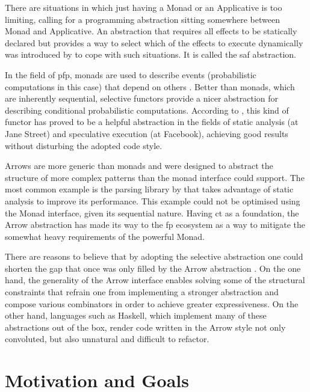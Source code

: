 \documentclass[
  oneside,
  11pt, a4paper,
  footinclude=true,
  headinclude=true,
  cleardoublepage=empty
]{scrbook}
\theoremstyle{definition}
\theoremstyle{definition}
\begin{document}
    There are situations in which just having a Monad or an Applicative is too limiting, calling for a programming abstraction sitting somewhere between Monad and Applicative. An abstraction that requires all effects to be statically declared but provides a way to select which of the effects to execute dynamically was introduced by \cite{andrey2019selective} to cope with such situations. It is called the \gls{saf} abstraction.

    In the field of \gls{pfp}, monads are used to describe events (probabilistic computations in this case) that depend on others \citep{erwig_kollmansberger_2006}. Better than monads, which are inherently sequential, selective functors provide a nicer abstraction for describing conditional probabilistic computations. According to \cite{andrey2019selective}, this kind of functor has proved to be a helpful abstraction in the fields of static analysis (at Jane Street) and speculative execution (at Facebook), achieving good results without disturbing the adopted code style.
    
    Arrows \citep{Hughes:2000:GMA:347238.347246} are more generic than monads and were designed to abstract the structure of more complex patterns than the monad interface could support. The most common example is the parsing library by \cite{swiestra&duponcheel} that takes advantage of static analysis to improve its performance. This example could not be optimised using the Monad interface, given its sequential nature. Having \gls{ct} as a foundation, the Arrow abstraction has made its way to the \gls{fp} ecosystem as a way to mitigate the somewhat heavy requirements of the powerful Monad.
    
    There are reasons to believe that by adopting the selective abstraction one could shorten the gap that once was only filled by the Arrow abstraction \citep{Hughes:2000:GMA:347238.347246}. On the one hand, the generality of the Arrow interface enables solving some of the structural constraints that refrain one from implementing a stronger abstraction and compose various combinators in order to achieve greater expressiveness. On the other hand, languages such as Haskell, which implement many of these abstractions out of the box, render code written in the Arrow style not only convoluted, but also unnatural and difficult to refactor.
    
    \section{Motivation and Goals}\label{sec-moti-goals}
    
\end{document}
